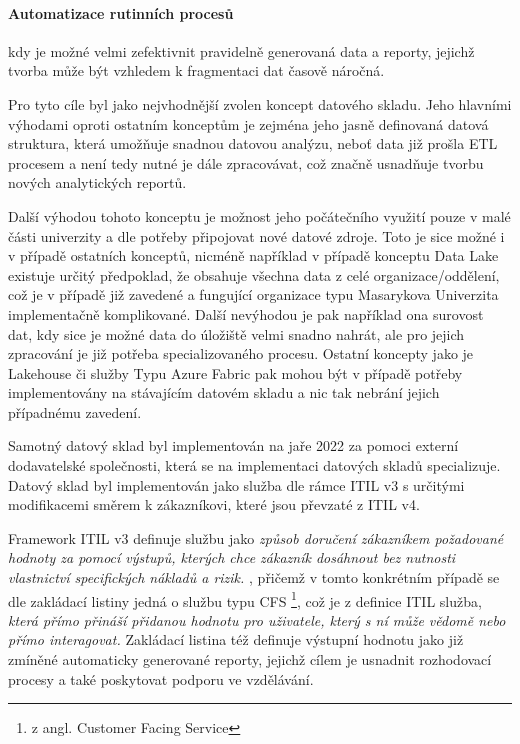 \documentclass[
  digital,     %
  twoside,     %
  lof,         %
  lot,         %
]{fithesis4}
\begin{document}
\paragraph{Automatizace rutinních procesů} kdy je možné velmi zefektivnit pravidelně generovaná data a reporty, jejichž tvorba může být vzhledem k fragmentaci dat časově náročná. 

Pro tyto cíle byl jako nejvhodnější zvolen koncept datového skladu. Jeho hlavními výhodami oproti ostatním konceptům je zejména jeho jasně definovaná datová struktura, která umožňuje snadnou datovou analýzu, neboť data již prošla ETL procesem a není tedy nutné je dále zpracovávat, což značně usnadňuje tvorbu nových analytických reportů.

Další výhodou tohoto konceptu je možnost jeho počátečního využití pouze v malé části univerzity a dle potřeby připojovat nové datové zdroje. Toto je sice možné i v případě ostatních konceptů, nicméně například v případě konceptu Data Lake existuje určitý předpoklad, že obsahuje všechna data z celé organizace/oddělení, což je v případě již zavedené a fungující organizace typu Masarykova Univerzita implementačně komplikované. Další nevýhodou je pak například ona surovost dat, kdy sice je možné data do úložiště velmi snadno nahrát, ale pro jejich zpracování je již potřeba specializovaného procesu. Ostatní koncepty jako je Lakehouse či služby Typu Azure Fabric pak mohou být v případě potřeby implementovány na stávajícím datovém skladu a nic tak nebrání jejich případnému zavedení.

Samotný datový sklad byl implementován na jaře 2022 za pomoci externí dodavatelské společnosti, která se na implementaci datových skladů specializuje. Datový sklad byl implementován jako služba dle rámce ITIL v3 s určitými modifikacemi směrem k zákazníkovi, které jsou převzaté z ITIL v4. 

Framework ITIL v3 definuje službu jako \emph{způsob doručení zákazníkem požadované hodnoty za pomocí výstupů, kterých chce zákazník dosáhnout bez nutnosti vlastnictví specifických nákladů a rizik.} \parencite{SyFvQA11lk1OaIec}, přičemž v tomto konkrétním případě se dle zakládací listiny jedná o službu typu CFS \footnote{z angl. Customer Facing Service}, což je z definice ITIL služba, \emph{která přímo přináší přidanou hodnotu pro uživatele, který s ní může vědomě nebo přímo interagovat.}\parencite{SyFvQA11lk1OaIec} Zakládací listina též definuje výstupní hodnotu jako již zmíněné automaticky generované reporty, jejichž cílem je usnadnit rozhodovací procesy a také poskytovat podporu ve vzdělávání.\parencite{Zechmeister2023}
\end{document}
